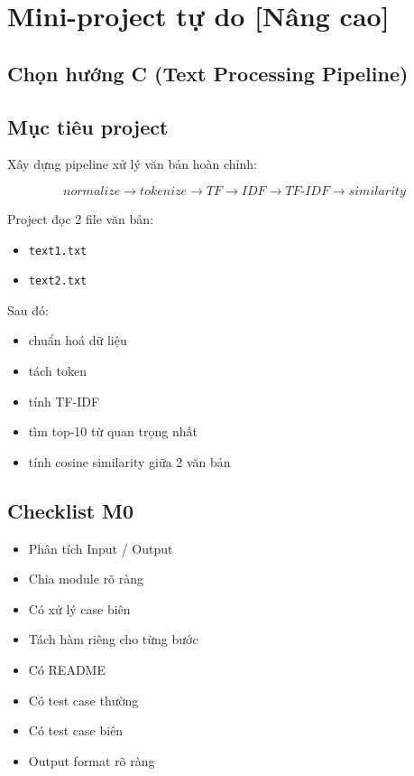 \section{Mini-project tự do [Nâng cao]}
\subsection{Chọn hướng C (Text Processing Pipeline)}

\subsection{Mục tiêu project}

Xây dựng pipeline xử lý văn bản hoàn chỉnh:

\[
normalize
\rightarrow
tokenize
\rightarrow
TF
\rightarrow
IDF
\rightarrow
TF\text{-}IDF
\rightarrow
similarity
\]

Project đọc 2 file văn bản:

\begin{itemize}
    \item \texttt{text1.txt}
    \item \texttt{text2.txt}
\end{itemize}

Sau đó:

\begin{itemize}
    \item chuẩn hoá dữ liệu
    \item tách token
    \item tính TF-IDF
    \item tìm top-10 từ quan trọng nhất
    \item tính cosine similarity giữa 2 văn bản
\end{itemize}

\subsection{Checklist M0}

\begin{itemize}

    \item[\checkmark] Phân tích Input / Output

    \item[\checkmark] Chia module rõ ràng

    \item[\checkmark] Có xử lý case biên

    \item[\checkmark] Tách hàm riêng cho từng bước

    \item[\checkmark] Có README

    \item[\checkmark] Có test case thường

    \item[\checkmark] Có test case biên

    \item[\checkmark] Output format rõ ràng

\end{itemize}

